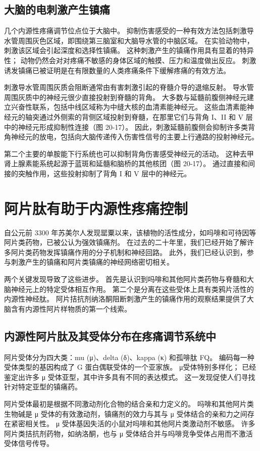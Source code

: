 \subsection{大脑的电刺激产生镇痛}
几个内源性疼痛调节位点位于大脑中。 抑制伤害感受的一种有效方法包括刺激导水管周围灰色区域，即围绕第三脑室和大脑导水管的中脑区域。 在实验动物中，刺激该区域会引起深度和选择性镇痛。 这种刺激产生的镇痛作用具有显着的特异性； 动物仍然会对对疼痛不敏感的身体区域的触摸、压力和温度做出反应。 刺激诱发镇痛已被证明是在有限数量的人类疼痛条件下缓解疼痛的有效方法。

刺激导水管周围灰质会阻断通常由有害刺激引起的脊髓介导的退缩反射。 导水管周围灰质中的神经元很少直接投射到脊髓的背角。 大多数与延髓前腹侧神经元建立兴奋性联系，包括中线区域称为中缝大核的血清素能神经元。 这些血清素能神经元的轴突通过外侧索的背侧区域投射到脊髓，在那里它们与背角 I、II 和 V 层中的神经元形成抑制性连接（图 20-17）。 因此，刺激延髓前腹侧会抑制许多类背角神经元的放电，包括向大脑传递传入伤害性信号的主要上行通路的投射神经元。

第二个主要的单胺能下行系统也可以抑制背角伤害感受神经元的活动。 这种去甲肾上腺素能系统起源于蓝斑和延髓和脑桥的其他核团（图 20-17）。 通过直接和间接的突触作用，这些投射抑制了背角 I 和 V 层中的神经元。


\section{阿片肽有助于内源性疼痛控制}
自公元前 3300 年苏美尔人发现罂粟以来，该植物的活性成分，如吗啡和可待因等阿片类药物，已被公认为强效镇痛剂。 在过去的二十年里，我们已经开始了解许多阿片类药物发挥镇痛作用的分子机制和神经回路。 此外，我们已经认识到，参与刺激产生的镇痛和阿片类镇痛的神经网络密切相关。

两个关键发现导致了这些进步。 首先是认识到吗啡和其他阿片类药物与脊髓和大脑神经元上的特定受体相互作用。 第二个是分离在这些受体上具有类鸦片活性的内源性神经肽。 阿片拮抗剂纳洛酮阻断刺激产生的镇痛作用的观察结果提供了大脑含有内源性阿片样物质的第一个线索。

\subsection{内源性阿片肽及其受体分布在疼痛调节系统中}
阿片受体分为四大类：mu (μ)、delta (δ)、kappa (κ) 和孤啡肽 FQ。 编码每一种受体类型的基因构成了 G 蛋白偶联受体的一个亚家族。 μ受体特别多样化； 已经鉴定出许多 μ 受体亚型，其中许多具有不同的表达模式。 这一发现促使人们寻找针对特定亚型的镇痛药。

阿片受体最初是根据不同激动剂化合物的结合亲和力定义的。 吗啡和其他阿片类生物碱是 μ 受体的有效激动剂，镇痛剂的效力与其与 μ 受体结合的亲和力之间存在紧密相关性。 μ 受体基因失活的小鼠对吗啡和其他阿片类激动剂不敏感。 许多阿片类拮抗剂药物，如纳洛酮，也与 μ 受体结合并与吗啡竞争受体占用而不激活受体信号传导。

